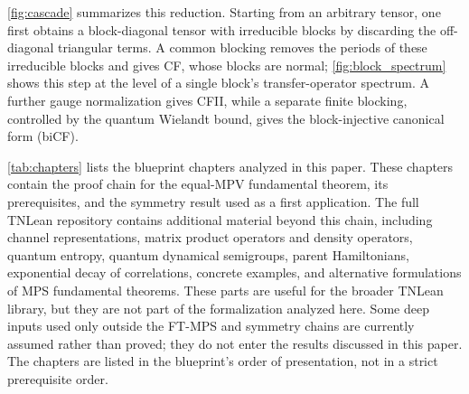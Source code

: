\cref{fig:cascade} summarizes this reduction. Starting from an arbitrary tensor, one first obtains a block-diagonal tensor with irreducible blocks by discarding the off-diagonal triangular terms. A common blocking removes the periods of these irreducible blocks and gives CF, whose blocks are normal; \cref{fig:block_spectrum} shows this step at the level of a single block's transfer-operator spectrum. A further gauge normalization gives CFII, while a separate finite blocking, controlled by the quantum Wielandt bound, gives the block-injective canonical form (biCF).







\cref{tab:chapters} lists the blueprint chapters analyzed in this paper. These chapters contain the proof chain for the equal-MPV fundamental theorem, its prerequisites, and the symmetry result used as a first application. The full TNLean repository contains additional material beyond this chain, including channel representations, matrix product operators and density operators, quantum entropy, quantum dynamical semigroups, parent Hamiltonians, exponential decay of correlations, concrete examples, and alternative formulations of MPS fundamental theorems. These parts are useful for the broader TNLean library, but they are not part of the formalization analyzed here. Some deep inputs used only outside the FT-MPS and symmetry chains are currently assumed rather than proved; they do not enter the results discussed in this paper. The chapters are listed in the blueprint's order of presentation, not in a strict prerequisite order.


